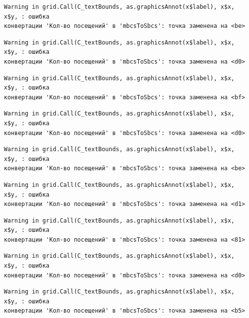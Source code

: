 \documentclass[
  letterpaper,
  DIV=11,
  numbers=noendperiod]{scrreprt}
\begin{document}
\begin{verbatim}
Warning in grid.Call(C_textBounds, as.graphicsAnnot(x$label), x$x, x$y, : ошибка
конвертации 'Кол-во посещений' в 'mbcsToSbcs': точка заменена на <be>
\end{verbatim}

\begin{verbatim}
Warning in grid.Call(C_textBounds, as.graphicsAnnot(x$label), x$x, x$y, : ошибка
конвертации 'Кол-во посещений' в 'mbcsToSbcs': точка заменена на <d0>
\end{verbatim}

\begin{verbatim}
Warning in grid.Call(C_textBounds, as.graphicsAnnot(x$label), x$x, x$y, : ошибка
конвертации 'Кол-во посещений' в 'mbcsToSbcs': точка заменена на <bf>
\end{verbatim}

\begin{verbatim}
Warning in grid.Call(C_textBounds, as.graphicsAnnot(x$label), x$x, x$y, : ошибка
конвертации 'Кол-во посещений' в 'mbcsToSbcs': точка заменена на <d0>
\end{verbatim}

\begin{verbatim}
Warning in grid.Call(C_textBounds, as.graphicsAnnot(x$label), x$x, x$y, : ошибка
конвертации 'Кол-во посещений' в 'mbcsToSbcs': точка заменена на <be>
\end{verbatim}

\begin{verbatim}
Warning in grid.Call(C_textBounds, as.graphicsAnnot(x$label), x$x, x$y, : ошибка
конвертации 'Кол-во посещений' в 'mbcsToSbcs': точка заменена на <d1>
\end{verbatim}

\begin{verbatim}
Warning in grid.Call(C_textBounds, as.graphicsAnnot(x$label), x$x, x$y, : ошибка
конвертации 'Кол-во посещений' в 'mbcsToSbcs': точка заменена на <81>
\end{verbatim}

\begin{verbatim}
Warning in grid.Call(C_textBounds, as.graphicsAnnot(x$label), x$x, x$y, : ошибка
конвертации 'Кол-во посещений' в 'mbcsToSbcs': точка заменена на <d0>
\end{verbatim}

\begin{verbatim}
Warning in grid.Call(C_textBounds, as.graphicsAnnot(x$label), x$x, x$y, : ошибка
конвертации 'Кол-во посещений' в 'mbcsToSbcs': точка заменена на <b5>
\end{verbatim}
\end{document}

